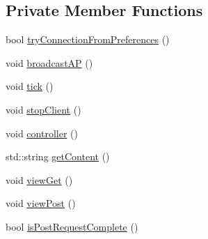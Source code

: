 \subsection*{Private Member Functions}
\begin{DoxyCompactItemize}
\item 
bool \mbox{\hyperlink{class_wi_fi_provisioning_a407f25abd209fbadc4385b02ea9cf7ed}{try\+Connection\+From\+Preferences}} ()
\item 
void \mbox{\hyperlink{class_wi_fi_provisioning_ab117eb89658dbbaebf6b940ef2fbf66c}{broadcast\+AP}} ()
\item 
void \mbox{\hyperlink{class_wi_fi_provisioning_a6ab4c333ef20388b336310bcd7edec6a}{tick}} ()
\item 
void \mbox{\hyperlink{class_wi_fi_provisioning_a482d01497b2e4319c427658dd036a5a9}{stop\+Client}} ()
\item 
void \mbox{\hyperlink{class_wi_fi_provisioning_a6cb7ce7ff15da1fefee419e33a43459c}{controller}} ()
\item 
std\+::string \mbox{\hyperlink{class_wi_fi_provisioning_ae3cfba93792f975df0bddf6328330d68}{get\+Content}} ()
\item 
void \mbox{\hyperlink{class_wi_fi_provisioning_a3d0b39ab0ec9cf3260e82d19c471d0fe}{view\+Get}} ()
\item 
void \mbox{\hyperlink{class_wi_fi_provisioning_ac27fd34f6f6dd317f2fba2d4bb7e609e}{view\+Post}} ()
\item 
bool \mbox{\hyperlink{class_wi_fi_provisioning_abab0aebc8cca7590962e6e513010fb43}{is\+Post\+Request\+Complete}} ()
\end{DoxyCompactItemize}
